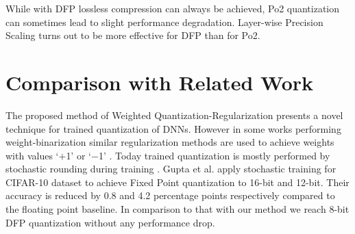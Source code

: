 
While with DFP lossless compression can always be achieved, Po2 quantization can sometimes lead to slight performance degradation. Layer-wise Precision Scaling turns out to be more effective for DFP than for Po2. 

\section{Comparison with Related Work}
The proposed method of Weighted Quantization-Regularization presents a novel technique for trained quantization of DNNs. However in some works performing weight-binarization similar regularization methods are used to achieve weights with values `$+$1' or `$-$1' \cite{Tang2017}. Today trained quantization is mostly performed by stochastic rounding during training \cite{Courbariaux2014, Courbariaux2015, Gysel2016, Gupta2015a}. Gupta et al. \cite{Gupta2015a} apply stochastic training for CIFAR-10 dataset to achieve Fixed Point quantization to 16-bit and 12-bit. Their accuracy is reduced by 0.8 and 4.2 percentage points respectively compared to the floating point baseline. In comparison to that with our method we reach 8-bit DFP quantization without any performance drop.

